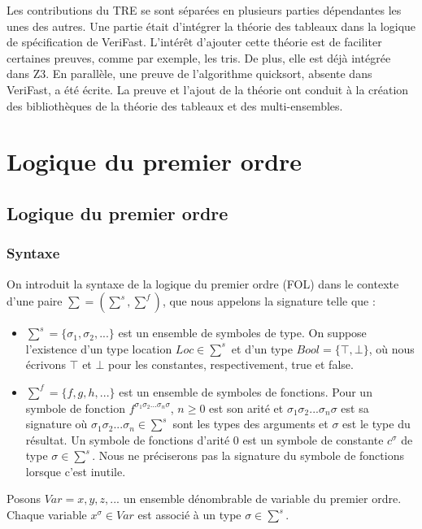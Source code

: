 \documentclass[9pt,openany]{book}
\newcommand{\verifast}{VeriFast}
\begin{document}
	 Les contributions du TRE se sont s\'epar\'ees en plusieurs parties d\'ependantes les unes des autres. Une partie \'etait d'int\'egrer la th\'eorie des tableaux dans la logique de sp\'ecification de \verifast. L'int\'er\^et d'ajouter cette th\'eorie est de faciliter certaines preuves, comme par exemple, les tris. De plus, elle est d\'ej\`a int\'egr\'ee dans Z3. En parall\`ele, une preuve de l'algorithme quicksort, absente dans \verifast, a \'et\'e \'ecrite. La preuve et l'ajout de la th\'eorie ont conduit \`a la cr\'eation des biblioth\`eques de la th\'eorie des tableaux et des multi-ensembles.



\chapter{Logique du premier ordre}
	\section{Logique du premier ordre}
		\subsection{Syntaxe}
		On introduit la syntaxe de la logique du premier ordre (FOL) dans le contexte d'une paire $\sum = (\sum^s,\sum^f)$, que nous appelons la signature telle que :
		\begin{itemize}
		\item $\sum^s = \{ \sigma_{1}, \sigma_{2},...\}$ est un ensemble de symboles de type. On suppose l'existence d'un type location $Loc \in \sum^{s}$ et d'un type $Bool = \{ \top , \bot \}$, o\`u nous \'ecrivons $\top$ et $\bot$ pour les constantes, respectivement, true et false.
		\item $\sum^f = \{ f, g, h,...\}$ est un ensemble de symboles de fonctions. Pour un symbole de fonction $f^{\sigma_{1}\sigma_{2}... \sigma_{n}\sigma}$, $n \geq 0$ est son arit\'e et $\sigma_{1}\sigma_{2}... \sigma_{n}\sigma$ est sa signature o\`u $\sigma_{1}\sigma_{2}... \sigma_{n} \in \sum^{s}$ sont les types des arguments et $\sigma$ est le type du r\'esultat. Un symbole de fonctions d'arit\'e 0 est un symbole de constante $c^{\sigma}$ de type $\sigma \in \sum^{s}$. Nous ne pr\'eciserons pas la signature du symbole de fonctions lorsque c'est inutile.
		\end{itemize}

	   Posons $Var = {x,y,z,...}$ un ensemble d\'enombrable de variable du premier ordre. Chaque variable $x^{\sigma} \in Var$ est associ\'e \`a un type $\sigma \in \sum^{s}$.
	   
\end{document}
